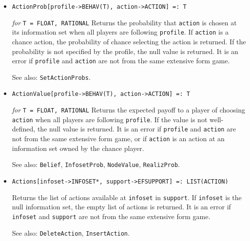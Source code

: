 \begin{itemize}



\item
\protect \large \begin{verbatim}
ActionProb[profile->BEHAV(T), action->ACTION] =: T
\end{verbatim}\normalsize

{\it for} {\tt T = FLOAT, RATIONAL}
\bd
Returns the probability that \verb+action+ is chosen at its
information set when all players are following \verb+profile+.
If \verb+action+ is a chance action, the probability of chance selecting
the action is returned.  If the probability is not specified by the 
profile, the null value is returned.  It is an error if \verb+profile+
and \verb+action+ are not from the same extensive form game.

\item [See also:] \verb+SetActionProbs+.
\ed

\item
\protect \large \begin{verbatim}
ActionValue[profile->BEHAV(T), action->ACTION] =: T
\end{verbatim}\normalsize

{\it for} {\tt T = FLOAT, RATIONAL}
\bd 
Returns the expected payoff to a player of choosing \verb+action+ when
all players are following \verb+profile+.  If the value is not well-defined,
the null value is returned.  It is an error if \verb+profile+ and
\verb+action+ are not from the same extensive form game, or if \verb+action+
is an action at an information set owned by the chance player.

\item [See also:] \verb+Belief+, \verb+InfosetProb+, \verb+NodeValue+,
\verb+RealizProb+.
\ed

\item
\protect \large \begin{verbatim} 
Actions[infoset->INFOSET*, support->EFSUPPORT] =: LIST(ACTION)
\end{verbatim}\normalsize

\bd
Returns the list of actions available at \verb+infoset+ in
\verb+support+.  If \verb+infoset+ is the null information set, the
empty list of actions is returned.  It is an error if \verb+infoset+
and \verb+support+ are not from the same extensive form game.

\item [See also:] \verb+DeleteAction+, \verb+InsertAction+.
\ed


\end{itemize}
